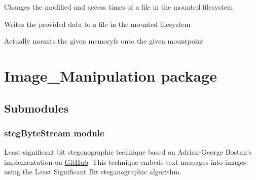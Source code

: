 \documentclass[letterpaper,10pt,english]{sphinxmanual}
\begin{document}
\begin{fulllineitems}
\begin{fulllineitems}
\end{fulllineitems}


\begin{fulllineitems}
\label{File_System:File_System.memfuse.MemFS.utimens}
Changes the modified and access times of a file in the mounted filesystem

\end{fulllineitems}


\begin{fulllineitems}
\label{File_System:File_System.memfuse.MemFS.write}
Writes the provided data to a file in the mounted filesystem

\end{fulllineitems}


\end{fulllineitems}


\begin{fulllineitems}
\label{File_System:File_System.memfuse.mount}
Actually mounts the given memoryfs onto the given mountpoint

\end{fulllineitems}



\section{Image\_Manipulation package}
\label{Image_Manipulation:image-manipulation-package}\label{Image_Manipulation::doc}

\subsection{Submodules}
\label{Image_Manipulation:submodules}

\subsubsection{stegByteStream module}
\label{Image_Manipulation:stegbytestream-module}
Least-significant bit stegenographic technique based on Adrian-George Bostan's implementation on \href{https://github.com/adrg/lsbsteg/blob/master/lsbsteg.py}{GitHub}. This technique embeds text messages into images using the Least Significant Bit steganographic algorithm.
\end{document}
